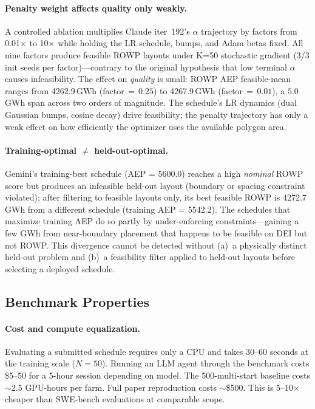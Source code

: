 \paragraph{Penalty weight affects quality only weakly.}
A controlled ablation multiplies Claude iter~192's $\alpha$
trajectory by factors from 0.01$\times$ to 10$\times$ while holding
the LR schedule, bumps, and Adam betas fixed. All nine factors
produce feasible ROWP layouts under K=50 stochastic gradient (3/3
init seeds per factor)---contrary to the original hypothesis that
low terminal $\alpha$ causes infeasibility. The effect on
\emph{quality} is small: ROWP AEP feasible-mean ranges from
4262.9\,GWh (factor$\,=\,0.25$) to 4267.9\,GWh
(factor$\,=\,0.01$), a $5.0$\,GWh span across two orders of
magnitude. The schedule's LR dynamics (dual Gaussian bumps,
cosine decay) drive feasibility; the penalty trajectory has only
a weak effect on how efficiently the optimizer uses the available
polygon area.

\paragraph{Training-optimal $\neq$ held-out-optimal.}
Gemini's training-best schedule (AEP = 5600.0) reaches a high
\emph{nominal} ROWP score but produces an infeasible held-out
layout (boundary or spacing constraint violated); after filtering
to feasible layouts only, its best feasible ROWP is 4272.7\,GWh
from a different schedule (training AEP = 5542.2). The schedules
that maximize training AEP do so partly by under-enforcing
constraints---gaining a few GWh from near-boundary placement that
happens to be feasible on DEI but not ROWP. This divergence cannot
be detected without (a)~a physically distinct held-out problem and
(b)~a feasibility filter applied to held-out layouts before
selecting a deployed schedule.

\subsection{Benchmark Properties}

\paragraph{Cost and compute equalization.}
Evaluating a submitted schedule requires only a CPU and takes
30--60 seconds at the training scale ($N\!=\!50$). Running an LLM
agent through the benchmark costs \$5--50 for a 5-hour session
depending on model. The 500-multi-start baseline costs
$\sim$2.5 GPU-hours per farm. Full paper reproduction costs
$\sim$\$500. This is 5--10$\times$ cheaper than SWE-bench
evaluations at comparable scope.

